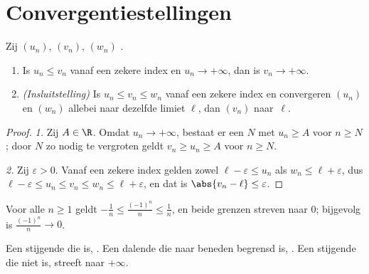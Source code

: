 \section{Convergentiestellingen}

\begin{theorem}\label{thm:g12:seq:squeeze}
Zij $(u_n)$, $(v_n)$, $(w_n)$ .
\begin{enumerate}
  \item Is $u_n \leq v_n$ vanaf een zekere index en $u_n \to +\infty$, dan is
        $v_n \to +\infty$.
  \item \emph{(Insluitstelling)} Is
        $u_n \leq v_n \leq w_n$ vanaf een zekere index en convergeren $(u_n)$
        en $(w_n)$ allebei naar dezelfde limiet $\ell$, dan 
        $(v_n)$ naar~$\ell$.
\end{enumerate}
\end{theorem}

\begin{proof}
\emph{1.} Zij $A \in \R$. Omdat $u_n \to +\infty$, bestaat er een $N$ met
$u_n \geq A$ voor $n \geq N$; door $N$ zo nodig te vergroten geldt
$v_n \geq u_n \geq A$ voor $n \geq N$.

\emph{2.} Zij $\varepsilon > 0$. Vanaf een zekere index gelden zowel
$\ell - \varepsilon \leq u_n$ als $w_n \leq \ell + \varepsilon$, dus
$\ell - \varepsilon \leq u_n \leq v_n \leq w_n \leq \ell + \varepsilon$, en
dat is $\abs{v_n - \ell} \leq \varepsilon$.
\end{proof}

\begin{example}
Voor alle $n \geq 1$ geldt $-\frac{1}{n} \leq \frac{(-1)^n}{n} \leq
\frac{1}{n}$, en beide grenzen streven naar $0$; bijgevolg is
$\frac{(-1)^n}{n} \to 0$.
\end{example}

\begin{theorem}\label{thm:g12:seq:monotone}
Een stijgende  die  is, . Een dalende  die
naar beneden begrensd is, . Een stijgende  die niet  is, streeft naar $+\infty$.
\end{theorem}


